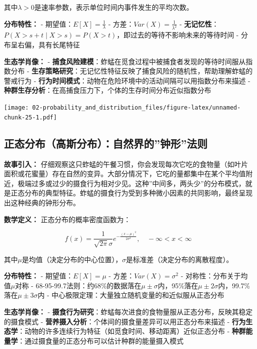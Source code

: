 \documentclass[
  twoside]{book}
\begin{document}
其中\(\lambda > 0\)是速率参数，表示单位时间内事件发生的平均次数。

\textbf{分布特性：}
- 期望值：\(E[X] = \frac{1}{\lambda}\)
- 方差：\(Var(X) = \frac{1}{\lambda^2}\)
- \textbf{无记忆性}：\(P(X > s + t \mid X > s) = P(X > t)\)，即过去的等待不影响未来的等待时间
- 分布呈右偏，具有长尾特征

\textbf{生态学肖像：}
- \textbf{捕食风险建模}：蚱蜢在觅食过程中被捕食者发现的等待时间服从指数分布
- \textbf{生存策略研究}：无记忆性特征反映了捕食风险的随机性，帮助理解蚱蜢的警戒行为
- \textbf{行为时间模式}：动物在危险环境中的活动间隔可以用指数分布来描述
- \textbf{种群生存分析}：在高捕食压力下，个体的生存时间分布近似指数分布

\texttt{[image: 02-probability\_and\_distribution\_files/figure-latex/unnamed-chunk-25-1.pdf]}

\hypertarget{ux6b63ux6001ux5206ux5e03ux9ad8ux65afux5206ux5e03ux81eaux7136ux754cux7684ux949fux5f62ux6cd5ux5219}{%
\subsection{正态分布（高斯分布）：自然界的''钟形''法则}\label{ux6b63ux6001ux5206ux5e03ux9ad8ux65afux5206ux5e03ux81eaux7136ux754cux7684ux949fux5f62ux6cd5ux5219}}

\textbf{故事引入：} 仔细观察这只蚱蜢的午餐习惯，你会发现每次它吃的食物量（如叶片面积或花蜜量）存在自然的变异。大部分情况下，它吃的量都集中在某个平均值附近，极端过多或过少的摄食行为相对少见。这种''中间多，两头少''的分布模式，就是正态分布的典型特征。蚱蜢的摄食行为受到多种微小因素的共同影响，最终呈现出这种经典的钟形分布。

\textbf{数学定义：} 正态分布的概率密度函数为：

\[f(x) = \frac{1}{\sqrt{2\pi}\sigma} e^{-\frac{(x-\mu)^2}{2\sigma^2}}, \quad -\infty < x < \infty\]

其中\(\mu\)是均值（决定分布的中心位置），\(\sigma\)是标准差（决定分布的离散程度）。

\textbf{分布特性：}
- 期望值：\(E[X] = \mu\)
- 方差：\(Var(X) = \sigma^2\)
- 对称性：分布关于均值\(\mu\)对称
- 68-95-99.7法则：约68\%的数据落在\(\mu \pm \sigma\)内，95\%落在\(\mu \pm 2\sigma\)内，99.7\%落在\(\mu \pm 3\sigma\)内
- 中心极限定理：大量独立随机变量的和近似服从正态分布

\textbf{生态学肖像：}
- \textbf{摄食行为研究}：蚱蜢每次进食的食物量服从正态分布，反映其稳定的摄食模式
- \textbf{营养摄入分析}：个体间的摄食量差异可以用正态分布来描述
- \textbf{行为生态学}：动物的许多连续行为特征（如觅食时间、移动距离）近似正态分布
- \textbf{种群能量学}：通过摄食量的正态分布可以估计种群的能量摄入模式
\end{document}

